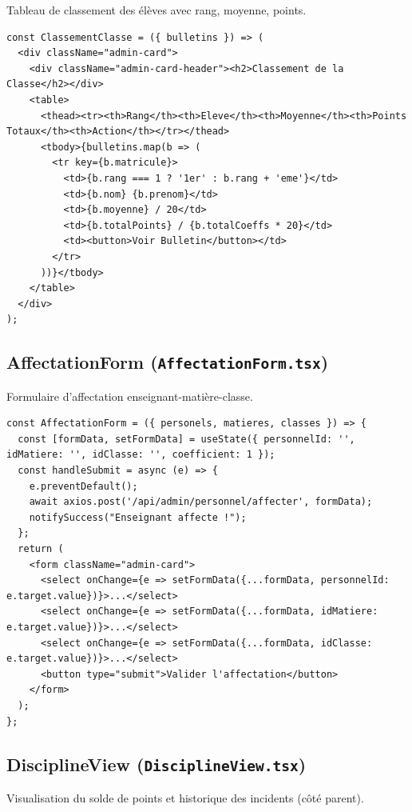 \documentclass[12pt,a4paper]{article}
\begin{document}
Tableau de classement des élèves avec rang, moyenne, points.

\begin{lstlisting}[style=code]
const ClassementClasse = ({ bulletins }) => (
  <div className="admin-card">
    <div className="admin-card-header"><h2>Classement de la Classe</h2></div>
    <table>
      <thead><tr><th>Rang</th><th>Eleve</th><th>Moyenne</th><th>Points Totaux</th><th>Action</th></tr></thead>
      <tbody>{bulletins.map(b => (
        <tr key={b.matricule}>
          <td>{b.rang === 1 ? '1er' : b.rang + 'eme'}</td>
          <td>{b.nom} {b.prenom}</td>
          <td>{b.moyenne} / 20</td>
          <td>{b.totalPoints} / {b.totalCoeffs * 20}</td>
          <td><button>Voir Bulletin</button></td>
        </tr>
      ))}</tbody>
    </table>
  </div>
);
\end{lstlisting}

\subsection{AffectationForm (\texttt{AffectationForm.tsx})}

Formulaire d'affectation enseignant-matière-classe.

\begin{lstlisting}[style=code]
const AffectationForm = ({ personels, matieres, classes }) => {
  const [formData, setFormData] = useState({ personnelId: '', idMatiere: '', idClasse: '', coefficient: 1 });
  const handleSubmit = async (e) => {
    e.preventDefault();
    await axios.post('/api/admin/personnel/affecter', formData);
    notifySuccess("Enseignant affecte !");
  };
  return (
    <form className="admin-card">
      <select onChange={e => setFormData({...formData, personnelId: e.target.value})}>...</select>
      <select onChange={e => setFormData({...formData, idMatiere: e.target.value})}>...</select>
      <select onChange={e => setFormData({...formData, idClasse: e.target.value})}>...</select>
      <button type="submit">Valider l'affectation</button>
    </form>
  );
};
\end{lstlisting}

\subsection{DisciplineView (\texttt{DisciplineView.tsx})}

Visualisation du solde de points et historique des incidents (côté parent).
\end{document}
